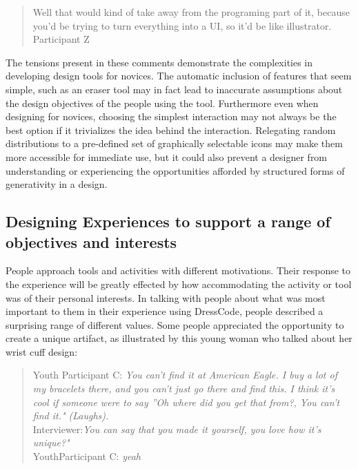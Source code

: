 \documentclass{sigchi}
\begin{document}
\begin{quotation}
 Well that would kind of take away from the programing part of it, because you’d be trying to turn everything into a UI, so it'd be like illustrator.
 \\Participant Z
\end{quotation}

The tensions present in these comments demonstrate the complexities in developing design tools for novices. The automatic inclusion of features that seem simple, such as an eraser tool may in fact lead to inaccurate assumptions about the design objectives of the people using the tool. Furthermore even when designing for novices, choosing the simplest interaction may not always be the best option if it trivializes the idea behind the interaction. Relegating random distributions to a pre-defined set of graphically selectable icons may make them more accessible for immediate use, but it could also prevent a designer from understanding or experiencing the opportunities afforded by structured forms of generativity in a design. 

\subsection{Designing Experiences to support a range of objectives and interests}
People approach tools and activities with different motivations. %
Their response to the experience will be greatly effected by how accommodating the activity or tool was of their personal interests. In talking with people about what was most important to them in their experience using DressCode, people described a surprising range of different values. Some people appreciated the opportunity to create a unique artifact, as illustrated by this young woman who talked about her wrist cuff design:
\begin{quotation}
Youth Participant C: \textit{You can't find it at American Eagle. I buy a lot of my bracelets there, and you can't just go there and find this. I think it's cool if someone were to say ''Oh where did you get that from?, You can't find it." (Laughs).}
\\Interviewer:\textit{You can say that you made it yourself, you love how it's unique?"}
\\YouthParticipant C: \textit{yeah}
\end{quotation}
\end{document}
